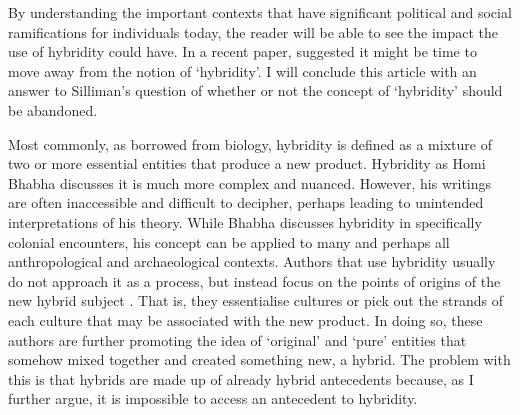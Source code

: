 	By understanding the important contexts that have significant political and social ramifications for individuals today, the reader will be able to see the impact the use of hybridity could have. In a recent paper, \textcite {Silliman_2014}  suggested it might be time to move away from the notion of ‘hybridity’. I will conclude this article with an answer to Silliman’s question of whether or not the concept of ‘hybridity’ should be abandoned. 
	
	
	Most commonly, as borrowed from biology, hybridity is defined as a mixture of two or more essential entities that produce a new product. Hybridity as Homi Bhabha discusses it is much more complex and nuanced. However, his writings are often inaccessible and difficult to decipher, perhaps leading to unintended interpretations of his theory. While Bhabha discusses hybridity in specifically colonial encounters, his concept can be applied to many and perhaps all anthropological and archaeological contexts. Authors that use hybridity usually do not approach it as a process, but instead focus on the points of origins of the new hybrid subject \parencite[267]{Deagan_2013}. That is, they essentialise cultures or pick out the strands of each culture that may be associated with the new product. In doing so, these authors are further promoting the idea of ‘original’ and ‘pure’ entities that somehow mixed together and created something new, a hybrid. The problem with this is that hybrids are made up of already hybrid antecedents because, as I further argue, it is impossible to access an antecedent to hybridity. 
	
